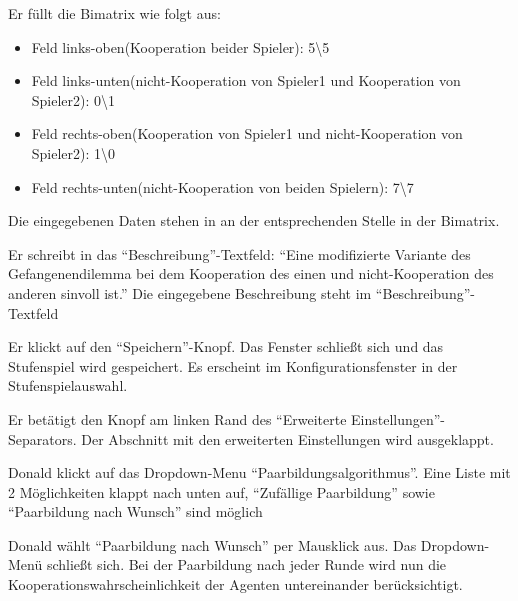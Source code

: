 \documentclass[parskip=full,11pt]{scrartcl}
\begin{document}
{Er füllt die Bimatrix wie folgt aus:
\begin{itemize}
\item Feld links-oben(Kooperation beider Spieler): 5\textbackslash 5
\item Feld links-unten(nicht-Kooperation von Spieler1 und Kooperation von Spieler2): 0\textbackslash 1
\item Feld rechts-oben(Kooperation von Spieler1 und nicht-Kooperation von Spieler2): 1\textbackslash 0
\item Feld rechts-unten(nicht-Kooperation von beiden Spielern): 7\textbackslash 7
\end{itemize}}
{Die eingegebenen Daten stehen in an der entsprechenden Stelle in der Bimatrix.}

{Er schreibt in das \enquote{Beschreibung}-Textfeld: \enquote{Eine modifizierte Variante des Gefangenendilemma bei dem Kooperation des einen und nicht-Kooperation des anderen sinvoll ist.}}
{Die eingegebene Beschreibung steht im \enquote{Beschreibung}-Textfeld}

{Er klickt auf den \enquote{Speichern}-Knopf.}
{Das Fenster schließt sich und das Stufenspiel wird gespeichert. Es erscheint im Konfigurationsfenster in der Stufenspielauswahl.}


{Er betätigt den Knopf am linken Rand des \enquote{Erweiterte Einstellungen}-Separators.}
{Der Abschnitt mit den erweiterten Einstellungen wird ausgeklappt.}

{Donald klickt auf das Dropdown-Menu \enquote{Paarbildungsalgorithmus}.}
{Eine Liste mit 2 Möglichkeiten klappt nach unten auf, \enquote{Zufällige Paarbildung} sowie \enquote{Paarbildung nach Wunsch} sind möglich}

{Donald wählt  \enquote{Paarbildung nach Wunsch} per Mausklick aus.}
{Das Dropdown-Menü schließt sich. Bei der Paarbildung nach jeder Runde wird nun die Kooperationswahrscheinlichkeit der Agenten untereinander berücksichtigt.}
\end{document}
